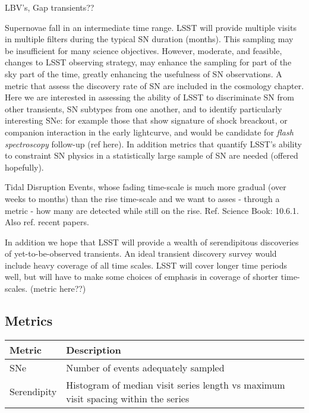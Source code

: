 LBV's, Gap transients??

Supernovae fall in an intermediate time range.  LSST will provide multiple visits in multiple filters during the typical SN duration (months).  This sampling may be insufficient for many science objectives.  However, moderate, and feasible, changes to LSST observing strategy, may enhance the sampling for part of the sky part of the time, greatly enhancing the usefulness of SN observations. A metric that assess the discovery rate of SN are included in the cosmology chapter. Here we are interested in assessing the ability of LSST to discriminate SN from other transients, SN subtypes from one another, and to identify particularly interesting SNe: for example those that show signature of shock breackout, or companion interaction in the early lightcurve, and would be candidate for \emph{flash spectroscopy} follow-up (ref here). In addition metrics that quantify LSST's ability to constraint SN physics in a statistically large sample of SN are needed (offered hopefully).



Tidal Disruption Events, whose fading time-scale is much more gradual (over weeks to months) than the rise time-scale and we want to asses - through a metric - how many are detected while still on the rise. Ref. Science Book: 10.6.1. Also ref. recent papers.

In addition we hope that LSST will provide a wealth of serendipitous discoveries of yet-to-be-observed transients.  An ideal transient discovery survey would include heavy coverage of all time scales. LSST will cover longer time periods well, but will have to make some choices of emphasis in coverage of shorter time-scales. (metric here??)



\subsection{Metrics}
\label{sec:\secname:metrics}

\begin{center}
\begin{tabular}{| p{5cm} |p{10cm} |}
\hline Metric & Description\\
\hline
SNe & Number of events adequately sampled\\
Serendipity & Histogram of median visit series length vs maximum visit spacing within the series\\
  \hline \end{tabular}
 \end{center}

